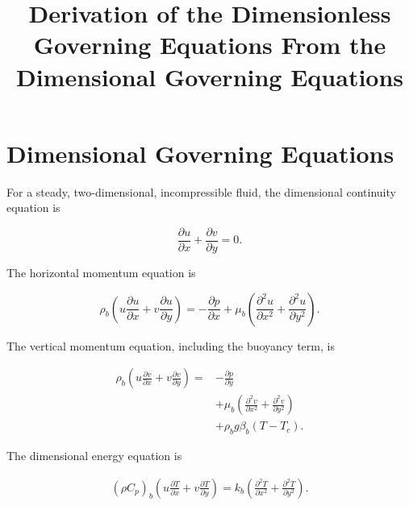 \documentclass[preprint,3p,number]{elsarticle}
\title{Derivation of the Dimensionless Governing Equations From the Dimensional Governing Equations}
\author{}
\begin{document}
\maketitle

\section{Dimensional Governing Equations}

For a steady, two-dimensional, incompressible fluid, the
dimensional continuity equation is

\begin{equation}
\frac{\partial u}{\partial x}
+
\frac{\partial v}{\partial y}
=0.
\label{eq:continuity_dim}
\end{equation}

The horizontal momentum equation is

\begin{equation}
\rho_b
\left(
u\frac{\partial u}{\partial x}
+
v\frac{\partial u}{\partial y}
\right)
=
-\frac{\partial p}{\partial x}
+
\mu_b
\left(
\frac{\partial^2u}{\partial x^2}
+
\frac{\partial^2u}{\partial y^2}
\right).
\label{eq:horizontal_dim}
\end{equation}

The vertical momentum equation, including the buoyancy term, is

\begin{equation}
\begin{aligned}
\rho_b
\left(
u\frac{\partial v}{\partial x}
+
v\frac{\partial v}{\partial y}
\right)
={}&-\frac{\partial p}{\partial y}\\
&+\mu_b
\left(
\frac{\partial^2v}{\partial x^2}
+
\frac{\partial^2v}{\partial y^2}
\right)\\
&+\rho_b g\beta_b(T-T_c).
\end{aligned}
\label{eq:vertical_dim}
\end{equation}

The dimensional energy equation is

\begin{equation}
\begin{aligned}
(\rho C_p)_b
\left(
u\frac{\partial T}{\partial x}
+
v\frac{\partial T}{\partial y}
\right)
=
k_b
\left(
\frac{\partial^2T}{\partial x^2}
+
\frac{\partial^2T}{\partial y^2}
\right).
\end{aligned}
\label{eq:energy_dim}
\end{equation}
\end{document}

